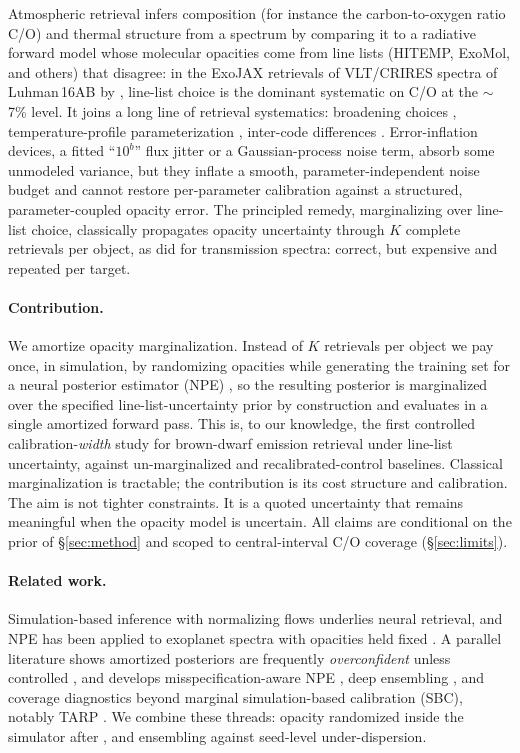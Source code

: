 \documentclass{article}
\begin{document}
Atmospheric retrieval infers composition (for instance the carbon-to-oxygen
ratio C/O) and thermal structure from a spectrum by comparing it to a radiative
forward model whose molecular opacities come from line lists
(HITEMP, ExoMol, and others) that disagree: in the ExoJAX retrievals of
VLT/CRIRES spectra of Luhman\,16AB by \citet{yama2026}, line-list choice is the
dominant systematic on C/O at the $\sim$7\% level. It joins a long line of retrieval systematics: broadening choices
\citep{gharibnezhad2019}, temperature-profile parameterization
\citep{rocchetto2016}, inter-code differences \citep{barstow2020}.
Error-inflation devices, a fitted ``$10^{b}$'' flux
jitter \citep{line2015} or a Gaussian-process noise term, absorb some unmodeled
variance, but they inflate a smooth, parameter-independent noise budget and
cannot restore per-parameter calibration against a structured, parameter-coupled
opacity error. The principled remedy, marginalizing over
line-list choice, classically propagates opacity uncertainty through $K$
complete retrievals per object, as \citet{niraula2022,niraula2023} did for
transmission spectra: correct, but expensive and repeated per target.

\paragraph{Contribution.}
We amortize opacity marginalization. Instead of $K$ retrievals per object we pay
once, in simulation, by randomizing opacities while generating the training set
for a neural posterior estimator (NPE)
\citep{papamakarios2016,greenberg2019,cranmer2020}, so the resulting posterior is
marginalized over the specified line-list-uncertainty prior by construction and
evaluates in a single amortized forward pass. This is, to our knowledge, the
first controlled calibration-\emph{width} study for brown-dwarf emission
retrieval under line-list uncertainty, against un-marginalized and
recalibrated-control baselines. Classical marginalization is
tractable; the contribution is its cost structure and calibration. The aim is not
tighter constraints. It is a quoted uncertainty that remains meaningful when the
opacity model is uncertain. All claims
are conditional on the prior of \S\ref{sec:method} and scoped to central-interval
C/O coverage (\S\ref{sec:limits}).

\paragraph{Related work.}
Simulation-based inference with normalizing flows
\citep{papamakarios2021,cranmer2020} underlies neural retrieval, and NPE has
been applied to exoplanet spectra with opacities held fixed
\citep{marquez2018,vasist2023}. A parallel literature shows amortized posteriors are
frequently \emph{overconfident} unless controlled \citep{hermans2022,%
delaunoy2022}, and develops misspecification-aware NPE
\citep{ward2022,cannon2022}, deep ensembling \citep{lakshminarayanan2017}, and
coverage diagnostics beyond marginal simulation-based calibration (SBC), notably
TARP \citep{lemos2023,talts2018}. We combine these threads: opacity randomized inside the simulator after
\citet{tobin2017}, and ensembling against seed-level under-dispersion.
\end{document}
